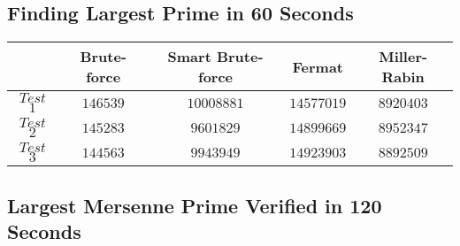 \documentclass[main.tex]{subfiles}
\begin{document}
\subsection{Finding Largest Prime in 60 Seconds}
\label{test1}

\begin{table}[ht!]
  \begin{tabular}{||c | c c c c||}
    \hline
    & Brute-force & Smart Brute-force & Fermat & Miller-Rabin \\ [0.5ex] 
    \hline\hline
    $Test$ $1$ & $146539$ & $10008881$ & $14577019$ & $8920403$\\ 
    $Test$ $2$ & $145283$ & $9601829$ & $14899669$ & $8952347$\\ 
    $Test$ $3$ & $144563$ & $9943949$ & $14923903$ & $8892509$\\   [1ex] 
    \hline
  \end{tabular}
\end{table}

\subsection{Largest Mersenne Prime Verified in 120 Seconds}
\label{test2}
\end{document}
